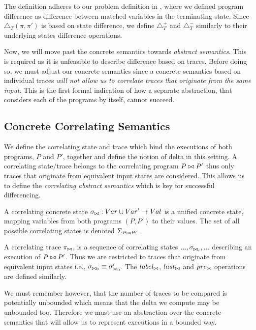 The definition adheres to our problem definition in , where we defined program difference as difference between matched variables in the terminating state. Since $\triangle_{T}(\pi,\pi')$ is based on state difference, we define $\triangle_{T}^{+}$ and $\triangle_{T}^{-}$ similarly to their underlying states difference operations.

Now, we will move past the concrete semantics towards \emph{abstract semantics}. This is required as it is unfeasible to describe difference based on traces. Before doing so, we must adjust our concrete semantics since a concrete semantics based on individual traces \emph{will not allow us to correlate traces that originate from the same input}. This is the first formal indication of how a separate abstraction, that considers each of the programs by itself, cannot succeed.

\subsection{Concrete Correlating Semantics} 

We define the correlating state and trace which bind the executions of both programs, $P$ and $P'$, together and define the notion of delta in this setting. A correlating state/trace belongs to the correlating program $P \bowtie P'$ thus only traces that originate from equivalent input states are considered. This allows us to define the \emph{correlating abstract semantics} which is key for successful differencing.

\begin{definition}
A correlating concrete state $\sigma_{\bowtie} : Var \cup Var' \rightarrow Val$ is a unified concrete state, mapping variables from both programs $(P,P')$ to their values. The set of all possible correlating states is denoted $\Sigma_{P {\bowtie} P'}$.
\end{definition}

\begin{definition}
A correlating trace $\pi_{\bowtie}$, is a sequence of correlating states $..., \sigma_{\bowtie_{i}}, ...$ describing an execution of $P \bowtie P'$. Thus we are restricted to traces that originate from equivalent input states i.e., $\sigma_{\bowtie_{0}} \equiv \sigma'_{\bowtie_{0}}$. The $label_{\bowtie}$, $last_{\bowtie}$ and $pre_{\bowtie}$ operations are defined similarly.
\end{definition}

We must remember however, that the number of traces to be compared is potentially unbounded which means that the delta we compute may be unbounded too. Therefore we must use an abstraction over the concrete semantics that will allow us to represent executions in a bounded way.
